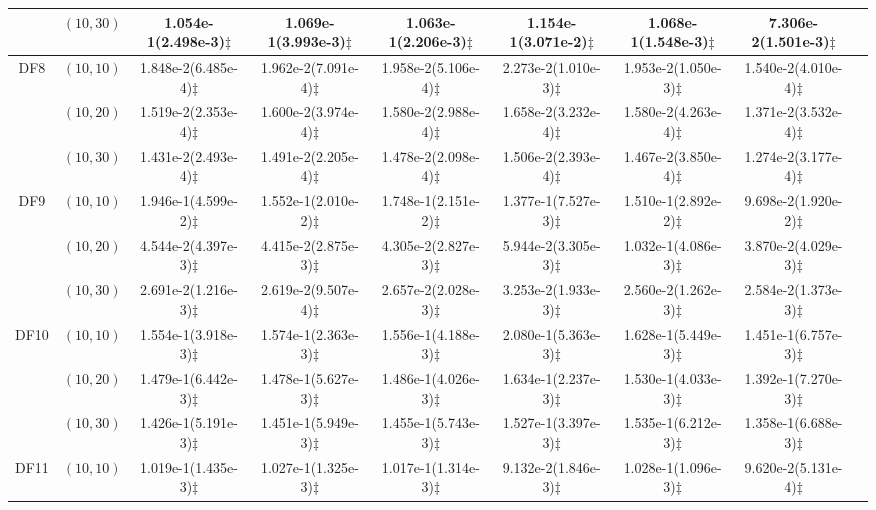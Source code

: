 \documentclass[review]{elsarticle}
\begin{document}
\begin{table*}[!tbh]
{{\begin{tabular} {ccccccccc}
&$(10,30)$ &1.054e-1(2.498e-3)$\ddagger$ &1.069e-1(3.993e-3)$\ddagger$ &1.063e-1(2.206e-3)$\ddagger$ &1.154e-1(3.071e-2)$\ddagger$ &1.068e-1(1.548e-3)$\ddagger$ &7.306e-2(1.501e-3)$\ddagger$ \\
\hline  \multirow{3}{*}{DF8}
&$(10,10)$ &1.848e-2(6.485e-4)$\ddagger$ &1.962e-2(7.091e-4)$\ddagger$ &1.958e-2(5.106e-4)$\ddagger$ &2.273e-2(1.010e-3)$\ddagger$ &1.953e-2(1.050e-3)$\ddagger$ &1.540e-2(4.010e-4)$\ddagger$ \\
&$(10,20)$ &1.519e-2(2.353e-4)$\ddagger$ &1.600e-2(3.974e-4)$\ddagger$ &1.580e-2(2.988e-4)$\ddagger$ &1.658e-2(3.232e-4)$\ddagger$ &1.580e-2(4.263e-4)$\ddagger$ &1.371e-2(3.532e-4)$\ddagger$ \\
&$(10,30)$ &1.431e-2(2.493e-4)$\ddagger$ &1.491e-2(2.205e-4)$\ddagger$ &1.478e-2(2.098e-4)$\ddagger$ &1.506e-2(2.393e-4)$\ddagger$ &1.467e-2(3.850e-4)$\ddagger$ &1.274e-2(3.177e-4)$\ddagger$ \\
\hline  \multirow{3}{*}{DF9}
&$(10,10)$ &1.946e-1(4.599e-2)$\ddagger$ &1.552e-1(2.010e-2)$\ddagger$ &1.748e-1(2.151e-2)$\ddagger$ &1.377e-1(7.527e-3)$\ddagger$ &1.510e-1(2.892e-2)$\ddagger$ &9.698e-2(1.920e-2)$\ddagger$ \\
&$(10,20)$ &4.544e-2(4.397e-3)$\ddagger$ &4.415e-2(2.875e-3)$\ddagger$ &4.305e-2(2.827e-3)$\ddagger$ &5.944e-2(3.305e-3)$\ddagger$ &1.032e-1(4.086e-3)$\ddagger$ &3.870e-2(4.029e-3)$\ddagger$ \\
&$(10,30)$ &2.691e-2(1.216e-3)$\ddagger$ &2.619e-2(9.507e-4)$\ddagger$ &2.657e-2(2.028e-3)$\ddagger$ &3.253e-2(1.933e-3)$\ddagger$ &2.560e-2(1.262e-3)$\ddagger$ &2.584e-2(1.373e-3)$\ddagger$ \\
\hline  \multirow{3}{*}{DF10}
&$(10,10)$ &1.554e-1(3.918e-3)$\ddagger$ &1.574e-1(2.363e-3)$\ddagger$ &1.556e-1(4.188e-3)$\ddagger$ &2.080e-1(5.363e-3)$\ddagger$ &1.628e-1(5.449e-3)$\ddagger$ &1.451e-1(6.757e-3)$\ddagger$ \\
&$(10,20)$ &1.479e-1(6.442e-3)$\ddagger$ &1.478e-1(5.627e-3)$\ddagger$ &1.486e-1(4.026e-3)$\ddagger$ &1.634e-1(2.237e-3)$\ddagger$ &1.530e-1(4.033e-3)$\ddagger$ &1.392e-1(7.270e-3)$\ddagger$ \\
&$(10,30)$ &1.426e-1(5.191e-3)$\ddagger$ &1.451e-1(5.949e-3)$\ddagger$ &1.455e-1(5.743e-3)$\ddagger$ &1.527e-1(3.397e-3)$\ddagger$ &1.535e-1(6.212e-3)$\ddagger$ &1.358e-1(6.688e-3)$\ddagger$ \\
\hline  \multirow{3}{*}{DF11}
&$(10,10)$ &1.019e-1(1.435e-3)$\ddagger$ &1.027e-1(1.325e-3)$\ddagger$ &1.017e-1(1.314e-3)$\ddagger$ &9.132e-2(1.846e-3)$\ddagger$ &1.028e-1(1.096e-3)$\ddagger$ &9.620e-2(5.131e-4)$\ddagger$ \\

\end{tabular}}}
\end{table*}
\end{document}
